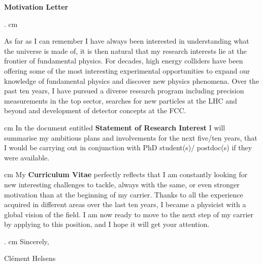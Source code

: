\documentclass[12pt]{article}
\begin{document}
\pagestyle{fancy}
\fancyhf{}

\begin{center}
{\bf \LARGE Motivation Letter} \\
\end{center}
. cm

As far as I can remember I have always been interested in understanding what the universe is made of, it is then natural that my research interests lie at the frontier of fundamental physics. For decades, high energy colliders have been offering some of the most interesting experimental opportunities to expand our knowledge of fundamental physics and discover new physics phenomena. Over the past ten years, I have pursued a diverse research program including precision measurements in the top sector, searches for new particles at the LHC and beyond and development of detector concepts at the FCC. 

 cm
In the document entitled {\bf Statement of Research Interest} I will summarise my ambitious plans and involvements for the next five/ten years, that I would be carrying out in conjunction with PhD student(s)/ postdoc(s) if they were available. 

 cm
My {\bf Curriculum Vitae} perfectly reflects that I am constantly looking for new interesting challenges to tackle, always with the same, or even stronger motivation than at the beginning of my carrier. Thanks to all the experience acquired in different areas over the last ten years, I became a physicist with a global vision of the field. I am now ready to move to the next step of my carrier by applying to this position, and I hope it will get your attention.

. cm
\noindent
Sincerely,

Cl\'ement Helsens
\end{document}
